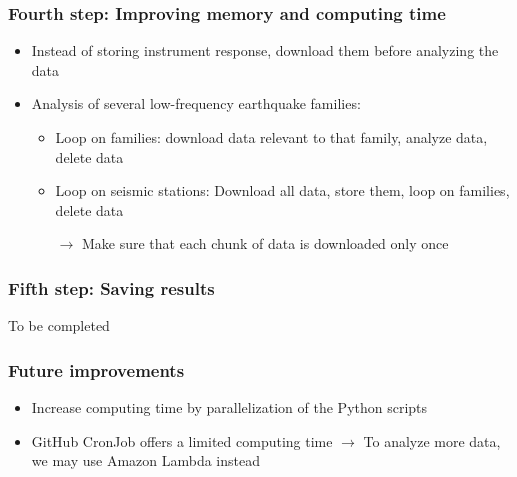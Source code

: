 \documentclass{beamer}
\begin{document}
	\begin{frame}
		\frametitle{Fourth step: Improving memory and computing time}
		\begin{itemize}
			\item Instead of storing instrument response, download them before analyzing the data
			\item Analysis of several low-frequency earthquake families:
			\begin{itemize}
				\item Loop on families: download data relevant to that family, analyze data, delete data
				\item Loop on seismic stations: Download all data, store them, loop on families, delete data

				$\rightarrow$ Make sure that each chunk of data is downloaded only once

			\end{itemize}
		\end{itemize}
	\end{frame}

	\begin{frame}
		\frametitle{Fifth step: Saving results}
		To be completed
	\end{frame}

	\begin{frame}
		\frametitle{Future improvements}
		\begin{itemize}
			\item Increase computing time by parallelization of the Python scripts
			\item GitHub CronJob offers a limited computing time $\rightarrow$ To analyze more data, we may use Amazon Lambda instead
		\end{itemize}
	\end{frame}

%
%
%
%
%
%
%
%
%
\end{document}
